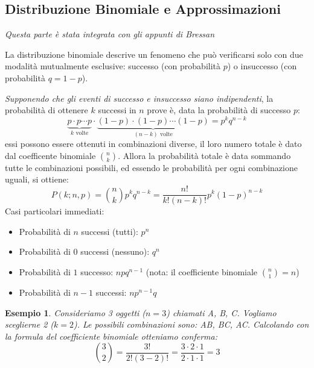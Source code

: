 \documentclass[openany,a4paper,12pt]{book}
\newtheorem*{example}{Esempio}
\theoremstyle{remark}
\begin{document}
\subsection{Distribuzione Binomiale e Approssimazioni}
\emph{Questa parte è stata integrata con gli appunti di Bressan}
\vspace{0.4 cm}

La distribuzione binomiale descrive un fenomeno che può verificarsi solo con due modalità mutualmente esclusive: successo (con probabilità $p$) o insuccesso (con probabilità $q=1-p$).

\textit{Supponendo che gli eventi di successo e insuccesso siano indipendenti}, la probabilità di ottenere $k$ successi in $n$ prove è, data la probabilità di successo $p$:
\[
\underbrace{p \cdot p \cdots p}_{k \text{ volte}} \cdot \underbrace{(1-p) \cdot (1-p) \cdots (1-p)}_{(n-k) \text{ volte}} = p^k q^{n-k}
\]
essi possono essere ottenuti in combinazioni diverse, il loro numero totale è dato dal coefficente binomiale $\binom{n}{k}$.
Allora la probabilità totale è data sommando tutte le combinazioni possibili, ed essendo le probabilità per ogni combinazione uguali, si ottiene:
\[
P(k;n,p) = \binom{n}{k}p^k q^{n-k} = \frac{n!}{k!(n-k)!}p^k (1-p)^{n-k}
\]
Casi particolari immediati:
\begin{itemize}[itemsep=0.1em]
 \item Probabilità di $n$ successi (tutti): $p^n$ 
 \item Probabilità di $0$ successi (nessuno): $q^n$  
 \item Probabilità di $1$ successo: $n p q^{n-1}$ (nota: il coefficiente binomiale $\binom{n}{1}=n$)
 \item Probabilità di $n-1$ successi: $n p^{n-1}q$
\end{itemize}

\begin{example}
    Consideriamo 3 oggetti ($n=3$) chiamati A, B, C. Vogliamo sceglierne 2 ($k=2$). 
    Le possibili combinazioni sono: AB, BC, AC.
    Calcolando con la formula del coefficiente binomiale otteniamo conferma:
    \[
    \binom{3}{2} = \frac{3!}{2!(3-2)!} = \frac{3 \cdot 2 \cdot 1}{2 \cdot 1 \cdot 1} = 3
    \]
\end{example}
\end{document}
